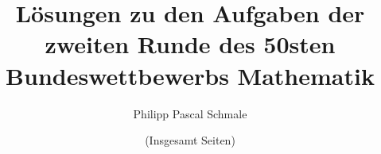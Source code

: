 \documentclass{article}
\date{(Insgesamt \pageref{LastPage} Seiten)}
\author{Philipp Pascal Schmale}
\title{Lösungen zu den Aufgaben der zweiten Runde des 50sten Bundeswettbewerbs Mathematik}
\begin{document}
\maketitle

\tableofcontents

\pagebreak


\pagebreak


\pagebreak


\pagebreak


\pagebreak

\end{document}
